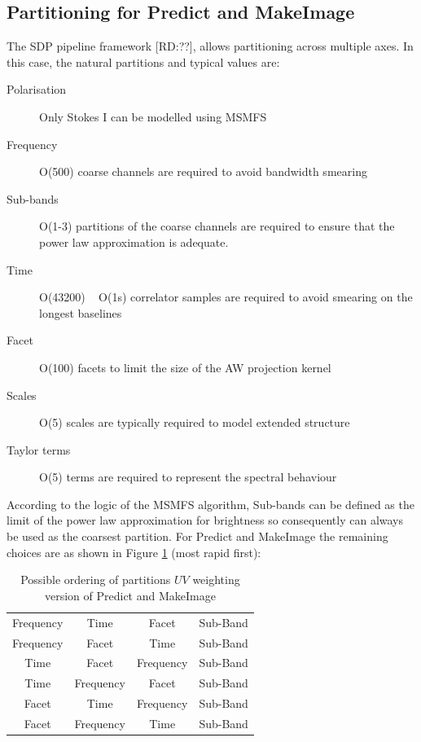 \documentclass[11pt,a4paper,variablewidth]{article}
\begin{document}
\subsection{Partitioning for Predict and MakeImage}
\label{subsec:partitoningpredictmakeimage}

The SDP pipeline framework [RD:??], allows partitioning across multiple axes. In this case, the natural partitions and typical values are:

\begin{description}
\item[Polarisation] Only Stokes I can be modelled using MSMFS
\item[Frequency] O(500) coarse channels are required to avoid bandwidth smearing
\item[Sub-bands] O(1-3) partitions of the coarse channels are required to ensure that the power law approximation is adequate.
\item[Time] O(43200) ~ O(1s) correlator samples are required to avoid smearing on the longest baselines
\item[Facet] O(100) facets to limit the size of the AW projection kernel
\item[Scales] O(5) scales are typically required to model extended structure
\item[Taylor terms] O(5) terms are required to represent the spectral behaviour
\end{description}

According to the logic of the MSMFS algorithm, Sub-bands can be defined as the limit of the power law approximation for brightness so consequently can always be used as the coarsest partition. For Predict and MakeImage the remaining choices are as shown in Figure \ref{tab:partitions} (most rapid first):

\begin{table}[htp]
 \caption{Possible ordering of partitions $UV$ weighting version of Predict and MakeImage}
 \label{tab:partitions}
 \begin{center}
 \begin{tabular}{|c|c|c|c|}
\hline
Frequency & Time & Facet & Sub-Band \\
Frequency & Facet & Time & Sub-Band \\
Time & Facet & Frequency & Sub-Band \\
Time & Frequency & Facet & Sub-Band \\
Facet & Time & Frequency & Sub-Band \\
Facet & Frequency & Time & Sub-Band \\
\hline
\end{tabular}
\end{center}
\end{table}
\end{document}
